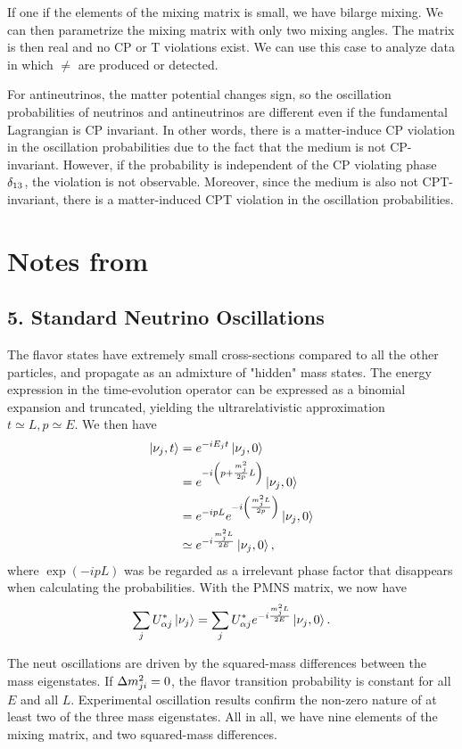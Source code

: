 \documentclass[twocolumn]{article}
\begin{document}
If one if the elements of the mixing matrix is small, we have bilarge mixing. We can then parametrize the mixing matrix with only two mixing angles. The matrix is then real and no CP or T violations exist. We can use this case to analyze data in which $\ne$ are produced or detected.

For antineutrinos, the matter potential changes sign, so the oscillation probabilities of neutrinos and antineutrinos are different even if the fundamental Lagrangian is CP invariant. In other words, there is a matter-induce CP violation in the oscillation probabilities due to the fact that the medium is not CP-invariant. However, if the probability is independent of the CP violating phase $\delta_{\text{{13}}}$, the violation is not observable. Moreover, since the medium is also not CPT-invariant, there is a matter-induced CPT violation in the oscillation probabilities. 

\section*{Notes from~\cite{heros2020}}
\subsection{5. Standard Neutrino Oscillations}
The flavor states have extremely small cross-sections compared to all the other particles, and propagate as an admixture of "hidden" mass states. The energy expression in the time-evolution operator can be expressed as a binomial expansion and truncated, yielding the ultrarelativistic approximation $t \simeq L, p \simeq E$. We then have
\begin{align*}
  \ket{\nu_j,t} &= e^{-iE_j t}\ket{\nu_j,0} \\
                &= e^{-i\left( p + \frac{m^2_j}{2p}L \right)}\ket{\nu_j,0} \\
                &= e^{-ipL} e^{-i\left(\frac{m^2_j L}{2p} \right)}\ket{\nu_j,0} \\
                &\simeq e^{-i \frac{m^2_j L}{2E}}\ket{\nu_j,0} 
,\end{align*}   
where $\exp(-ipL)$ was be regarded as a irrelevant phase factor that disappears when calculating the probabilities. With the PMNS matrix, we now have
\begin{align*}
  \sum_j U^*_{\alpha j}\ket{\nu_j} = \sum_j U^*_{\alpha j} e^{-i \frac{m^2_j L}{2E}}\ket{\nu_j,0} 
.\end{align*}

The neut oscillations are driven by the squared-mass differences between the mass eigenstates. If $\dm_{ji} = 0$, the flavor transition probability is constant for all $E$ and all $L$. Experimental oscillation results confirm the non-zero nature of at least two of the three mass eigenstates. All in all, we have nine elements of the mixing matrix, and two squared-mass differences.
\end{document}
